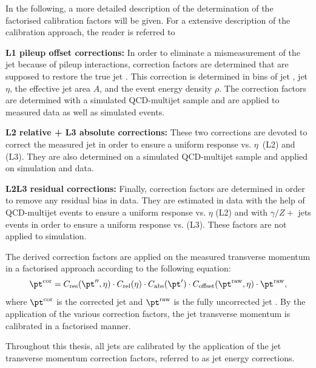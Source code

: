 In the following, a more detailed description of the determination of the factorised calibration factors will be given.
For a extensive description of the calibration approach, the reader is referred to~\cite{bib:CMS:JERCPaper_2011}
\begin{description}
\item \textbf{L1 pileup offset corrections:} In order to eliminate a mismeasurement of the jet \pt because of pileup interactions, correction factors are determined that are supposed to restore the true jet \pt. This correction is determined in bins of jet \pt, jet $\eta$, the effective jet area $A$, and the event energy density $\rho$. The correction factors are determined with a simulated QCD-multijet sample and are applied to measured data as well as simulated events.
\item \textbf{L2 relative + L3 absolute corrections:} These two corrections are devoted to correct the measured jet \pt in order to ensure a uniform response vs. \mbox{$\eta$ (L2)} and \mbox{\pt (L3)}. They are also determined on a simulated QCD-multijet sample and applied on simulation and data.
\item \textbf{L2L3 residual corrections:} Finally, correction factors are determined in order to remove any residual bias in data. They are estimated in data with the help of QCD-multijet events to ensure a uniform response vs. $\eta$ (L2) and with $\gamma/Z+$ jets events in order to ensure a uniform response vs. \pt (L3).
These factors are not applied to simulation.\\
\end{description}

The derived correction factors are applied on the measured transverse momentum in a factorised approach according to the following equation:
\begin{equation}
\pt^\mathrm{cor} =  C_\mathrm{res}(\pt'', \eta) \cdot C_{\mathrm{rel}}(\eta) \cdot C_{\mathrm{abs}}(\pt') \cdot C_{\mathrm{offset}}(\pt^\mathrm{raw}, \eta) \cdot  \pt^\mathrm{raw},
\end{equation}
where $\pt^\mathrm{cor}$ is the corrected jet \pt and  $\pt^\mathrm{raw}$ is the fully uncorrected jet \pt.
By the application of the various correction factors, the jet transverse momentum is calibrated in a factorised manner.

Throughout this thesis, all jets are calibrated by the application of the jet transverse momentum correction factors, referred to as jet energy corrections.


